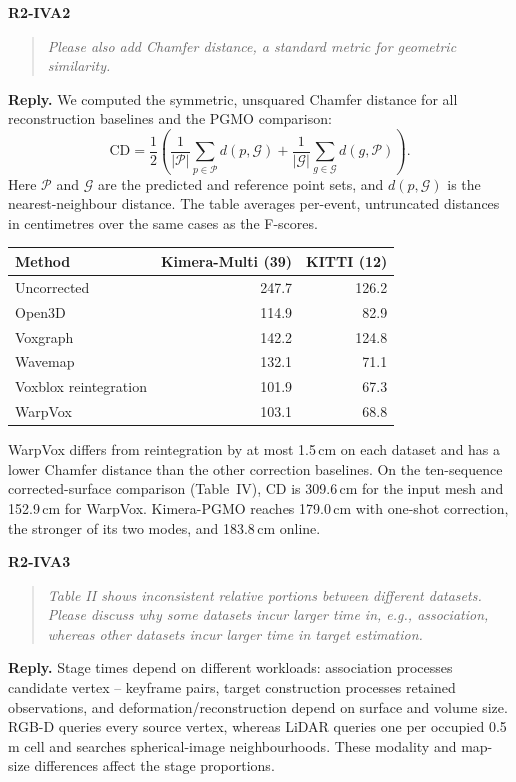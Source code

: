 \documentclass[11pt,a4paper]{article}
\newcommand{\point}[2]{\par\medskip\textbf{#1}\par\begin{quote}\itshape #2\end{quote}}
\newenvironment{reply}{\begingroup\color{replyblue}\textbf{Reply.} }{\par\endgroup}
\begin{document}
\point{R2-IVA2}{Please also add Chamfer distance, a standard metric for geometric similarity.}
\begin{reply}
We computed the symmetric, unsquared Chamfer distance for all reconstruction baselines and the PGMO comparison:
\[
\mathrm{CD}=\frac12\left(\frac{1}{|\mathcal P|}\sum_{p\in\mathcal P}d(p,\mathcal G)
+\frac{1}{|\mathcal G|}\sum_{g\in\mathcal G}d(g,\mathcal P)\right).
\]
Here $\mathcal P$ and $\mathcal G$ are the predicted and reference point sets, and $d(p,\mathcal G)$ is the nearest-neighbour distance. The table averages per-event, untruncated distances in centimetres over the same cases as the F-scores.
\begin{center}\small
\begin{tabular}{lrr}\toprule
Method & Kimera-Multi (39) & KITTI (12)\\\midrule
Uncorrected & 247.7 & 126.2\\
Open3D & 114.9 & 82.9\\
Voxgraph & 142.2 & 124.8\\
Wavemap & 132.1 & 71.1\\
Voxblox reintegration & 101.9 & 67.3\\
WarpVox & 103.1 & 68.8\\\bottomrule
\end{tabular}
\end{center}
WarpVox differs from reintegration by at most 1.5\,cm on each dataset and has a lower Chamfer distance than the other correction baselines. On the ten-sequence corrected-surface comparison (Table~IV), CD is 309.6\,cm for the input mesh and 152.9\,cm for WarpVox. Kimera-PGMO reaches 179.0\,cm with one-shot correction, the stronger of its two modes, and 183.8\,cm online.
\end{reply}

\point{R2-IVA3}{Table II shows inconsistent relative portions between different datasets. Please discuss why some datasets incur larger time in, e.g., association, whereas other datasets incur larger time in target estimation.}
\begin{reply}
Stage times depend on different workloads: association processes candidate vertex -- keyframe pairs, target construction processes retained observations, and deformation/reconstruction depend on surface and volume size. RGB-D queries every source vertex, whereas LiDAR queries one per occupied 0.5\,m cell and searches spherical-image neighbourhoods. These modality and map-size differences affect the stage proportions. 
\end{reply}
\end{document}
